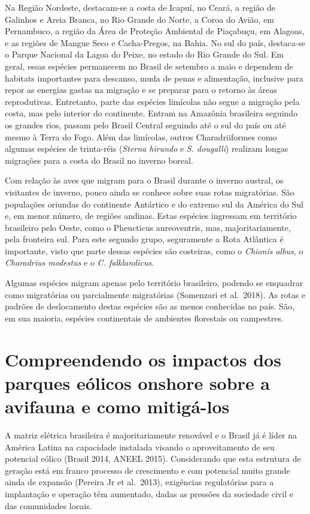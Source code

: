 \documentclass[
]{scrbook}
\begin{document}
Na Região Nordeste, destacam-se a costa de Icapuí, no Ceará, a região de Galinhos e Areia Branca, no Rio Grande do Norte, a Coroa do Avião, em Pernambuco, a região da Área de Proteção Ambiental de Piaçabuçu, em Alagoas, e as regiões de Mangue Seco e Cacha-Pregos, na Bahia. No sul do país, destaca-se o Parque Nacional da Lagoa do Peixe, no estado do Rio Grande do Sul. Em geral, essas espécies permanecem no Brasil de setembro a maio e dependem de habitats importantes para descanso, muda de penas e alimentação, inclusive para repor as energias gastas na migração e se preparar para o retorno às áreas reprodutivas. Entretanto, parte das espécies limícolas não segue a migração pela costa, mas pelo interior do continente. Entram na Amazônia brasileira seguindo os grandes rios, passam pelo Brasil Central seguindo até o sul do país ou até mesmo à Terra do Fogo. Além das limícolas, outros Charadriiformes como algumas espécies de trinta-réis (\emph{Sterna hirundo} e \emph{S. dougalli}) realizam longas migrações para a costa do Brasil no inverno boreal.

Com relação às aves que migram para o Brasil durante o inverno austral, os visitantes de inverno, pouco ainda se conhece sobre suas rotas migratórias. São populações oriundas do continente Antártico e do extremo sul da América do Sul e, em menor número, de regiões andinas. Estas espécies ingressam em território brasileiro pelo Oeste, como o Pheucticus aureoventris, mas, majoritariamente, pela fronteira sul. Para este segundo grupo, seguramente a Rota Atlântica é importante, visto que parte dessas espécies são costeiras, como o \emph{Chionis albus}, o \emph{Charadrius modestus} e o \emph{C. falklandicus}.

Algumas espécies migram apenas pelo território brasileiro, podendo se enquadrar como migratórias ou parcialmente migratórias (Somenzari et al.~2018). As rotas e padrões de deslocamento destas espécies são as menos conhecidas no país. São, em sua maioria, espécies continentais de ambientes florestais ou campestres.

\hypertarget{impactos}{%
\section{Compreendendo os impactos dos parques eólicos onshore sobre a avifauna e como mitigá-los}\label{impactos}}

A matriz elétrica brasileira é majoritariamente renovável e o Brasil já é líder na América Latina na capacidade instalada visando o aproveitamento de seu potencial eólico (Brasil 2014, ANEEL 2015). Considerando que esta estrutura de geração está em franco processo de crescimento e com potencial muito grande ainda de expansão (Pereira Jr et al.~2013), exigências regulatórias para a implantação e operação têm aumentado, dadas as pressões da sociedade civil e das comunidades locais.
\end{document}
